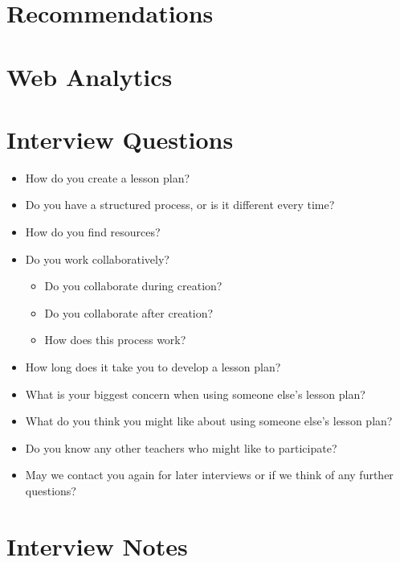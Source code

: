 \documentclass[10pt,letter]{article}
\begin{document}
\section{Recommendations}

\section{Web Analytics}

\pagebreak
\appendix

\section{Interview Questions}
\label{interview questions}
\begin{itemize}
	\item How do you create a lesson plan?

	\item Do you have a structured process, or is it different every time?

	\item How do you find resources?

	\item Do you work collaboratively?
	\begin{itemize}
		\item Do you collaborate during creation?

		\item Do you collaborate after creation?

		\item How does this process work?
	\end{itemize}

	\item How long does it take you to develop a lesson plan?

	\item What is your biggest concern when using someone else's lesson plan?

	\item What do you think you might like about using someone else's lesson
		plan?

	\item Do you know any other teachers who might like to participate?

	\item May we contact you again for later interviews or if we think of any
		further questions?
\end{itemize}

\section{Interview Notes}
\label{interview notes}


\pagebreak

\end{document}
